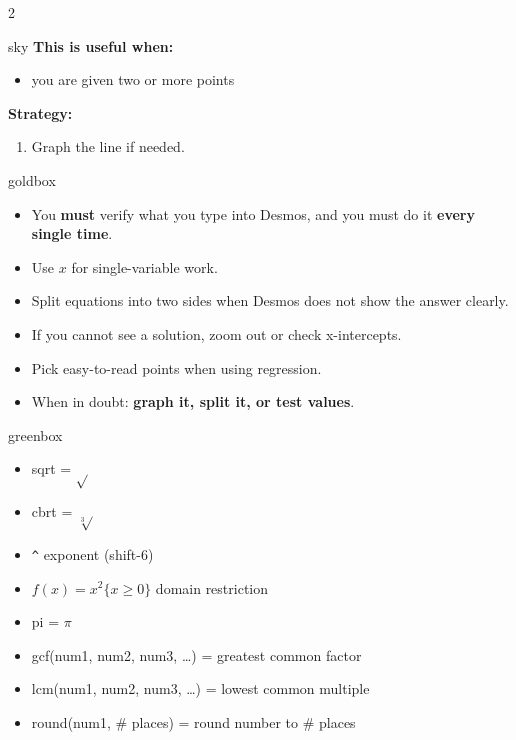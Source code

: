 \documentclass[10pt]{article}
\begin{document}
\begin{multicols}{2}
\begin{skillbox}{sky}
            \textbf{This is useful when:}
            \begin{itemize}
                \item you are given two or more points
            \end{itemize}

            \textbf{Strategy:}
            \begin{enumerate}
                \item Graph the line if needed.
            \end{enumerate}
        \end{skillbox}

        \begin{skillbox}{goldbox}
            \begin{itemize}
                \item You \textbf{must} verify what you type into Desmos, and you must do it \textbf{every single time}.
                \item Use \textbf{$x$} for single-variable work.
                \item Split equations into two sides when Desmos does not show the answer clearly.
                \item If you cannot see a solution, zoom out or check x-intercepts.
                \item Pick easy-to-read points when using regression.
                \item When in doubt: \textbf{graph it, split it, or test values}.
            \end{itemize}
        \end{skillbox}

        \begin{skillbox}{greenbox}
            \begin{itemize}
                \item sqrt = $\sqrt{}$
                \item cbrt = $\sqrt[3]{}$
                \item \texttt{\textasciicircum} exponent (shift-6)
                \item $f(x) = x^2 \{x \ge 0\}$ domain restriction
                \item pi = $\pi$
                \item gcf(num1, num2, num3, \ldots) = greatest common factor
                \item lcm(num1, num2, num3, \ldots) = lowest common multiple
                \item round(num1, \# places) = round number to \# places
            \end{itemize}
        \end{skillbox}
    \end{multicols}
\end{document}
